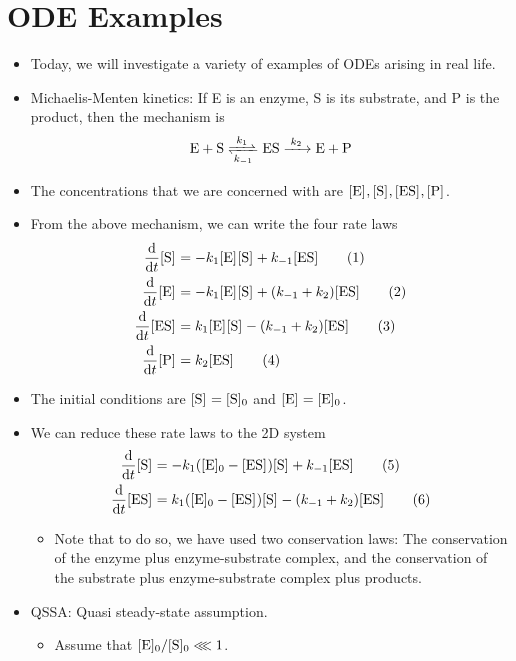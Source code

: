 \documentclass[../notes.tex]{subfiles}
\begin{document}
\section{ODE Examples}
\begin{itemize}
    \item {}Today, we will investigate a variety of examples of ODEs arising in real life.
    \item Michaelis-Menten kinetics: If E is an enzyme, S is its substrate, and P is the product, then the mechanism is
    \begin{equation*}
        \ce{E + S <=>[$k_1$][$k_{-1}$] ES ->[$k_2$] E + P}
    \end{equation*}
    \item The concentrations that we are concerned with are $\cnc{E},\cnc{S},\cnc{ES},\cnc{P}$.
    \item From the above mechanism, we can write the four rate laws
    \begin{align*}
        \dv{t}\cnc{S} &= -k_1\cnc{E}\cnc{S}+k_{-1}\cnc{ES}\tag{1}\\
        \dv{t}\cnc{E} &= -k_1\cnc{E}\cnc{S}+(k_{-1}+k_2)\cnc{ES}\tag{2}\\
        \dv{t}\cnc{ES} &= k_1\cnc{E}\cnc{S}-(k_{-1}+k_2)\cnc{ES}\tag{3}\\
        \dv{t}\cnc{P} &= k_2\cnc{ES}\tag{4}
    \end{align*}
    \item The initial conditions are $\cnc{S}=\cnc[0]{S}$ and $\cnc{E}=\cnc[0]{E}$.
    \item We can reduce these rate laws to the 2D system
    \begin{align*}
        \dv{t}\cnc{S} &= -k_1(\cnc[0]{E}-\cnc{ES})\cnc{S}+k_{-1}\cnc{ES}\tag{5}\\
        \dv{t}\cnc{ES} &= k_1(\cnc[0]{E}-\cnc{ES})\cnc{S}-(k_{-1}+k_2)\cnc{ES}\tag{6}
    \end{align*}
    \begin{itemize}
        \item Note that to do so, we have used two conservation laws: The conservation of the enzyme plus enzyme-substrate complex, and the conservation of the substrate plus enzyme-substrate complex plus products.
    \end{itemize}
    \item QSSA: Quasi steady-state assumption.
    \begin{itemize}
        \item Assume that $\cnc[0]{E}/\cnc[0]{S}\lll 1$.

\end{itemize}
\end{itemize}
\end{document}
